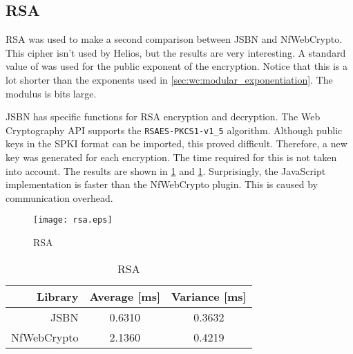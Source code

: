 \subsection{RSA}

RSA was used to make a second comparison between JSBN and NfWebCrypto. This cipher isn't used by Helios, but the results are very interesting. A standard value of  was used for the public exponent of the encryption. Notice that this is a lot shorter than the exponents used in \ref{sec:wc:modular_exponentiation}. The modulus is  bits large.

\par JSBN has specific functions for RSA encryption and decryption. The Web Cryptography API supports the \texttt{RSAES-PKCS1-v1\_5} algorithm.\cite{rfc3447} Although public keys in the SPKI format can be imported, this proved difficult. Therefore, a new key was generated for each encryption. The time required for this is not taken into account. The results are shown in \ref{fig:wc:rsa} and \ref{tab:wc:rsa}. Surprisingly, the JavaScript implementation is faster than the NfWebCrypto plugin. This is caused by communication overhead.

\begin{figure}
  \centering
  \texttt{[image: rsa.eps]}
  \caption{RSA}
  \label{fig:wc:rsa}
\end{figure}

\begin{table}
  \centering
  \caption{RSA}
  \label{tab:wc:rsa}
  \begin{tabular}{r | c c}
    Library & Average [ms] & Variance [ms] \\ \hline
    JSBN & 0.6310 & 0.3632  \\
    NfWebCrypto & 2.1360 & 0.4219
  \end{tabular}
\end{table}
